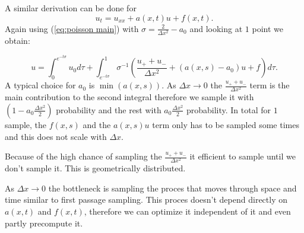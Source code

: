 \documentclass[a4paper,12pt]{article}
\begin{document}
A similar derivation can be done for
\begin{equation}
    u_{t} = u_{xx} + a(x,t)u + f(x,t)
    .
\end{equation}
Again using (\ref{eq:poisson main}) with $\sigma = \frac{2}{\Delta x^{2}} -a_{0}$ and looking at $1$ point we obtain:

\begin{equation}
    u =
    \int_{0}^{e^{-t \sigma }} u_{0} d\tau  + \int_{e^{-t \sigma }}^{1}
    \sigma^{-1}
    \left(
    \frac{u_{+} + u_{-}}{\Delta x^{2}} +(a(x,s)- a_{0}) u+ f
    \right)
    d\tau
    .
\end{equation}
A typical choice for $a_{0} $ is $\min (a(x,s))$. As $\Delta x \rightarrow 0$ the $\frac{u_{+} + u_{-}}{\Delta x^{2}}$ term is
the main contribution to the second integral therefore we sample it with $(1 - a_{0} \frac{\Delta x^2}{2})$ probability and
the rest with $a_{0} \frac{\Delta x^2}{2}$ probability. In total for $1$ sample, the $f(x,s)$ and the $a(x,s)u$ term only
has to be sampled some times and this does not scale with $\Delta x$.

\begin{julia}
    Because of the high chance of sampling the $\frac{u_{+} + u_{-}}{\Delta x^{2}}$ it efficient
    to sample until we don't sample it. This is geometrically distributed.
    \vspace{0.3cm}
\end{julia}

As $\Delta x \rightarrow 0$ the bottleneck is sampling the proces that moves through space and time similar
to first passage sampling.
This proces doesn't depend directly on $a(x,t)$ and $f(x,t)$, therefore we can optimize it
independent of it and even partly precompute it.




\end{document}

